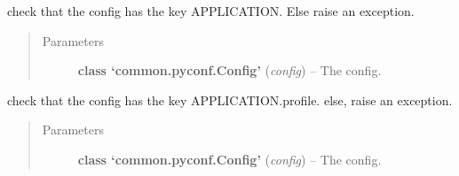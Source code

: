 \documentclass[a4paper,10pt,english]{sphinxmanual}
\begin{document}
\begin{fulllineitems}
\label{commands/apidoc/src:src.__init__.check_config_has_application}
check that the config has the key APPLICATION. Else raise an exception.
\begin{quote}\begin{description}
\item[{Parameters}] \leavevmode
\textbf{class `common.pyconf.Config'} (\emph{config}) -- The config.

\end{description}\end{quote}

\end{fulllineitems}


\begin{fulllineitems}
\label{commands/apidoc/src:src.__init__.check_config_has_profile}
check that the config has the key APPLICATION.profile.
else, raise an exception.
\begin{quote}\begin{description}
\item[{Parameters}] \leavevmode
\textbf{class `common.pyconf.Config'} (\emph{config}) -- The config.

\end{description}\end{quote}

\end{fulllineitems}


\begin{fulllineitems}
\label{commands/apidoc/src:src.__init__.config_has_application}
\end{fulllineitems}

\end{document}
